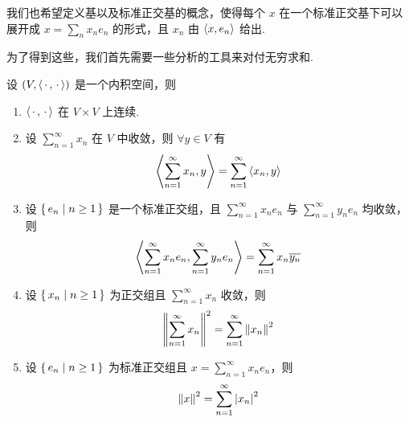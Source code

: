 我们也希望定义基以及标准正交基的概念，使得每个 $x$ 在一个标准正交基下可以展开成 $x=\sum\limits_nx_ne_n$ 的形式，且 $x_n$ 由 $\left\langle{x,e_n}\right\rangle$ 给出.

为了得到这些，我们首先需要一些分析的工具来对付无穷求和.


\begin{property}
    设 $(V,\left\langle{\,\cdot\,,\,\cdot\,}\right\rangle)$ 是一个内积空间，则

    \begin{enumerate}
        \item $\left\langle{\,\cdot\,,\,\cdot\,}\right\rangle$ 在 $V\times V$ 上连续.
        
        \item 设 $\sum\limits_{n=1}^\infty x_n$ 在 $V$ 中收敛，则 $\forall y\in V$ 有
$$
\left\langle{\sum_{n=1}^\infty x_n,y}\right\rangle=\sum_{n=1}^\infty\left\langle{x_n,y}\right\rangle
$$

        \item 设 $\set{e_n|n\ge 1}$ 是一个标准正交组，且 $\sum\limits_{n=1}^\infty x_ne_n$ 与 $\sum\limits_{n=1}^\infty y_ne_n$ 均收敛，则
$$
\left\langle{\sum_{n=1}^\infty x_ne_n,\sum_{n=1}^\infty y_ne_n}\right\rangle=\sum_{n=1}^\infty x_n\overline{y_n}
$$

        \item 设 $\set{x_n|n\ge 1}$ 为正交组且 $\sum\limits_{n=1}^\infty x_n$ 收敛，则
$$
\left\lVert{\sum_{n=1}^\infty x_n}\right\rVert^2=\sum_{n=1}^\infty\left\lVert{x_n}\right\rVert^2
$$

        \item 设 $\set{e_n|n\ge 1}$ 为标准正交组且 $x=\sum\limits_{n=1}^\infty x_ne_n$，则
$$
\left\lVert{x}\right\rVert^2=\sum_{n=1}^\infty\left\lvert{x_n}\right\rvert^2
$$
    \end{enumerate}
\end{property}
